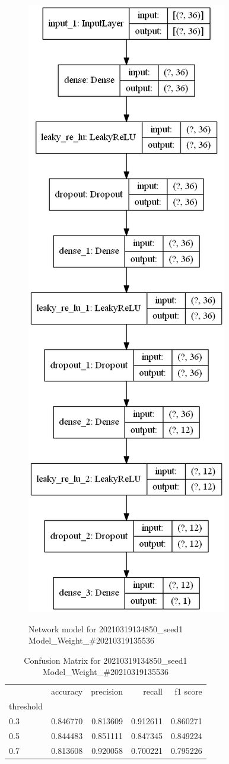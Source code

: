         \begin{figure}
        \caption{Network model for 20210319134850\_seed1 Model\_Weight\_\#20210319135536}
        \centering
            \includegraphics[width=0.5\linewidth]{20210319134850_seed1/ModelWeight20210319135536/model_struct.png}
        \label{fig:20210319134850seed1/ModelWeight20210319135536/modelstruct.png}
        \end{figure}
        \begin{table}
\centering
\caption{Confusion Matrix for 20210319134850\_seed1 Model\_Weight\_\#20210319135536}
\label{tab:conf_matr20210319134850seed1ModelWeight20210319135536}
\begin{tabular}{lrrrr}
\toprule
{} &  accuracy &  precision &    recall &  f1 score \\
threshold &           &            &           &           \\
\midrule
0.3       &  0.846770 &   0.813609 &  0.912611 &  0.860271 \\
0.5       &  0.844483 &   0.851111 &  0.847345 &  0.849224 \\
0.7       &  0.813608 &   0.920058 &  0.700221 &  0.795226 \\
\bottomrule
\end{tabular}
\end{table}
